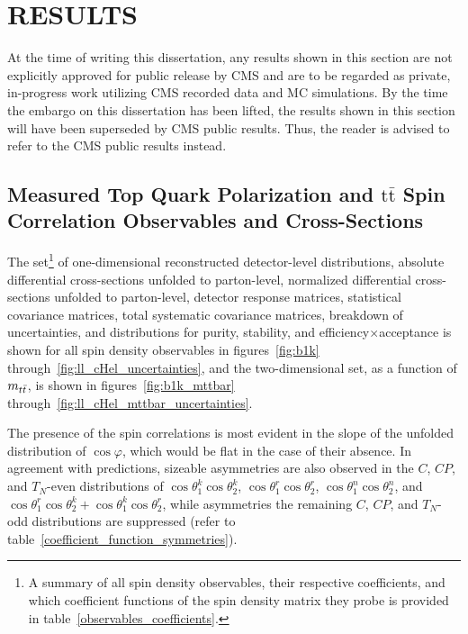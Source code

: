 
\chapter{RESULTS}
\label{Results}

At the time of writing this dissertation, any results shown in this section are not explicitly approved for public release by CMS and are to be regarded as private, in-progress work utilizing CMS recorded data and MC simulations.
By the time the embargo on this dissertation has been lifted, the results shown in this section will have been superseded by CMS public results.
Thus, the reader is advised to refer to the CMS public results instead.

\section{Measured Top Quark Polarization and \ensuremath{\mathrm{t\bar{t}}} Spin Correlation Observables and Cross-Sections}
The set\footnote{A summary of all spin density observables, their respective coefficients, and which coefficient functions of the spin density matrix they probe is provided in table~\ref{observables_coefficients}.} of one-dimensional reconstructed detector-level distributions, absolute differential cross-sections unfolded to parton-level, normalized differential cross-sections unfolded to parton-level, detector response matrices, statistical covariance matrices, total systematic covariance matrices, breakdown of uncertainties, and distributions for purity, stability, and efficiency$\times$acceptance is shown for all spin density observables in figures~\ref{fig:b1k} through~\ref{fig:ll_cHel_uncertainties}, and the two-dimensional set, as a function of $m_{t\bar{t}}$, is shown in figures~\ref{fig:b1k_mttbar} through~\ref{fig:ll_cHel_mttbar_uncertainties}.

The presence of the spin correlations is most evident in the slope of the unfolded distribution of $\cos\varphi$, which would be flat in the case of their absence.
In agreement with predictions, sizeable asymmetries are also observed in the $C$, $CP$, and $T_N$-even distributions of $\cos\theta_{1}^{k}\cos\theta_{2}^{k}$, $\cos\theta_{1}^{r}\cos\theta_{2}^{r}$, $\cos\theta_{1}^{n}\cos\theta_{2}^{n}$, and $\cos\theta_{1}^{r}\cos\theta_{2}^{k}+\cos\theta_{1}^{k}\cos\theta_{2}^{r}$, while asymmetries the remaining $C$, $CP$, and $T_N$-odd distributions are suppressed (refer to table~\ref{coefficient_function_symmetries}).


